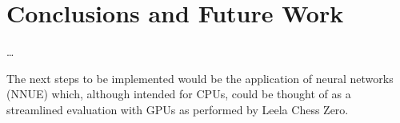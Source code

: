 \chapter{Conclusions and Future Work}
\label{cap:conclusiones}

\dots

The next steps to be implemented would be the application of neural networks (NNUE) which, although intended for CPUs, could be thought of as a streamlined evaluation with GPUs as performed by Leela Chess Zero.